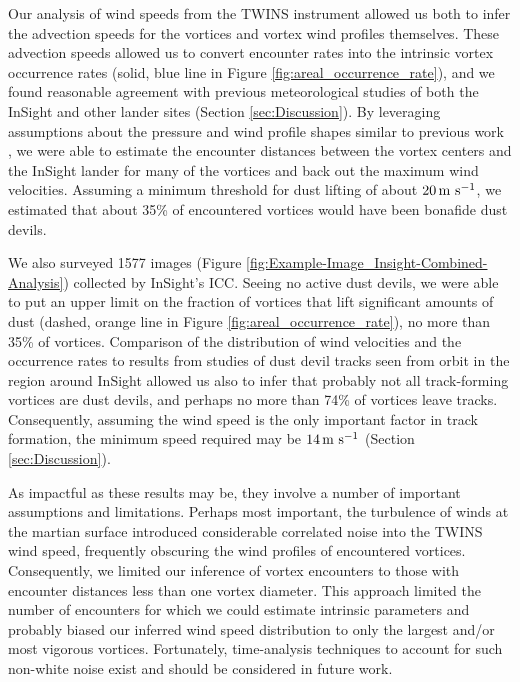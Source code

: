 \documentclass[linenumbers,trackchanges]{aastex63}
\begin{document}
Our analysis of wind speeds from the TWINS instrument allowed us both to infer the advection speeds for the vortices and vortex wind profiles themselves. These advection speeds allowed us to convert encounter rates into the intrinsic vortex occurrence rates (solid, blue line in Figure \ref{fig:areal_occurrence_rate}), and we found reasonable agreement with previous meteorological studies of both the InSight and other lander sites (Section \ref{sec:Discussion}). By leveraging assumptions about the pressure and wind profile shapes similar to previous work \citep{2016Icar..271..326L}, we were able to estimate the encounter distances between the vortex centers and the InSight lander for many of the vortices and back out the maximum wind velocities. Assuming a minimum threshold for dust lifting of about $20\,{\rm m\ s^{-1}}$, we estimated that about 35\% of encountered vortices would have been bonafide dust devils. 

We also surveyed 1577 images (Figure \ref{fig:Example-Image_Insight-Combined-Analysis}) collected by InSight's ICC. Seeing no active dust devils, we were able to put an upper limit on the fraction of vortices that lift significant amounts of dust (dashed, orange line in Figure \ref{fig:areal_occurrence_rate}), no more than 35\% of vortices. Comparison of the distribution of wind velocities and the occurrence rates to results from studies of dust devil tracks seen from orbit in the region around InSight \citep{2020GeoRL..4787234P} allowed us also to infer that probably not all track-forming vortices are dust devils, and perhaps no more than 74\% of vortices leave tracks. Consequently, assuming the wind speed is the only important factor in track formation, the minimum speed required may be $14\,{\rm m\ s^{-1}}$ (Section \ref{sec:Discussion}). 

As impactful as these results may be, they involve a number of important assumptions and limitations. Perhaps most important, the turbulence of winds at the martian surface introduced considerable correlated noise \citep[\emph{cf.}][]{2018RemS...10...65J} into the TWINS wind speed, frequently obscuring the wind profiles of encountered vortices. Consequently, we limited our inference of vortex encounters to those with encounter distances less than one vortex diameter. This approach limited the number of encounters for which we could estimate intrinsic parameters and probably biased our inferred wind speed distribution to only the largest and/or most vigorous vortices. Fortunately, time-analysis techniques to account for such non-white noise exist \citep{hodlr} and should be considered in future work. 
\end{document}
